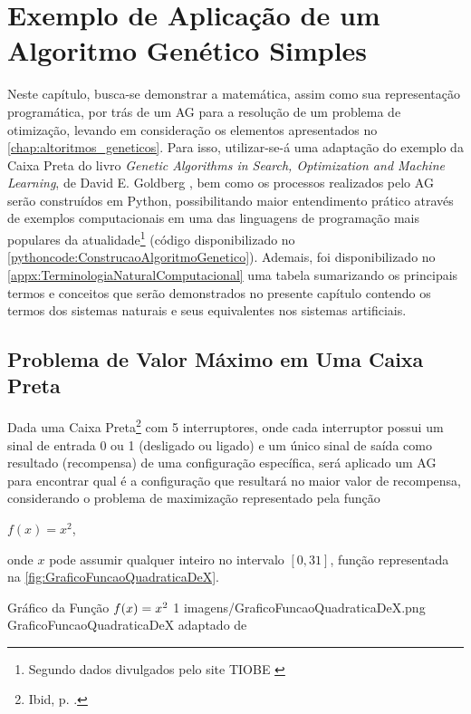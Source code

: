 \chapter{Exemplo de Aplicação de um Algoritmo Genético Simples}

Neste capítulo, busca-se demonstrar a matemática, assim como sua representação programática, por trás de um AG para a resolução de um problema de otimização, levando em consideração os elementos apresentados no \autoref{chap:altoritmos_geneticos}. Para isso, utilizar-se-á uma adaptação do exemplo da Caixa Preta do livro \textit{Genetic Algorithms in Search, Optimization and Machine Learning}, de David E. Goldberg \citeyearpar{goldberg_genetic_1989}, bem como os processos realizados pelo AG serão construídos em Python, possibilitando maior entendimento prático através de exemplos computacionais em uma das linguagens de programação mais populares da atualidade\footnote{Segundo dados divulgados pelo site TIOBE \citet{noauthor_index_nodate}} (código disponibilizado no \autoref{pythoncode:ConstrucaoAlgoritmoGenetico}). Ademais, foi disponibilizado no \autoref{appx:TerminologiaNaturalComputacional} uma tabela sumarizando os principais termos e conceitos que serão demonstrados no presente capítulo contendo os termos dos sistemas naturais e seus equivalentes nos sistemas artificiais.

\section{Problema de Valor Máximo em Uma Caixa Preta}
\label{sec:ProblemaValorMaximoCaixaPreta}

Dada uma Caixa Preta\footnote{Ibid, p. \pageref{rodape:problema_caixa_preta}.} com 5 interruptores, onde cada interruptor possui um sinal de entrada 0 ou 1 (desligado ou ligado) e um único sinal de saída como resultado (recompensa) de uma configuração específica, será aplicado um AG para encontrar qual é a configuração que resultará no maior valor de recompensa, considerando o problema de maximização representado pela função

\begin{center}
	$f(x) = x^2$,
\end{center}

\noindent onde $x$ pode assumir qualquer inteiro no intervalo $\left[0, 31\right]$, função representada na \autoref{fig:GraficoFuncaoQuadraticaDeX}.

\figura
	{Gráfico da Função $\lowercase{f}(\lowercase{x}) = \lowercase{x}^2$}
	{1}
	{imagens/GraficoFuncaoQuadraticaDeX.png}
	{GraficoFuncaoQuadraticaDeX}
	{adaptado de \citet[pg.8]{goldberg_genetic_1989}}
	
